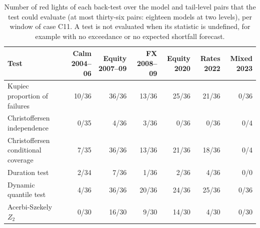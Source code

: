 \begin{table}[htbp]
\centering
\scriptsize
\setlength{\tabcolsep}{2.5pt}
\caption{Number of red lights of each back-test over the model and tail-level pairs that the test could evaluate (at most thirty-six pairs: eighteen models at two levels), per window of case C11. A test is not evaluated when its statistic is undefined, for example with no exceedance or no expected shortfall forecast.}
\label{tab:market-reds}
\begin{tabular}{lrrrrrr}
\toprule
Test & Calm 2004--06 & Equity 2007--09 & FX 2008--09 & Equity 2020 & Rates 2022 & Mixed 2023 \\
\midrule
\relax Kupiec proportion of failures & 10/36 & 36/36 & 13/36 & 25/36 & 21/36 & 0/36 \\
\relax Christoffersen independence & 0/35 & 4/36 & 3/36 & 0/36 & 0/36 & 0/4 \\
\relax Christoffersen conditional coverage & 7/35 & 36/36 & 13/36 & 21/36 & 18/36 & 0/4 \\
\relax Duration test & 2/34 & 7/36 & 1/36 & 2/36 & 4/36 & 0/0 \\
\relax Dynamic quantile test & 4/36 & 36/36 & 20/36 & 24/36 & 25/36 & 0/36 \\
\relax Acerbi-Szekely $Z_2$ & 0/30 & 16/30 & 9/30 & 14/30 & 4/30 & 0/30 \\
\bottomrule
\end{tabular}
\end{table}

